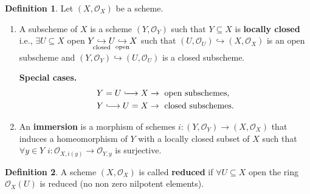 \documentclass[12pt]{article}
\theoremstyle{definition}
\newtheorem*{definition}{Definition}
\begin{document}
\begin{definition}
Let $(X,\mathcal O_X)$ be a scheme.

\begin{enumerate}[label=\arabic*)]
\item A subscheme of $X$ is a scheme $(Y,\mathcal O_Y)$ such that $Y\subseteq X$ is \textbf{locally closed} i.e., $\exists U\subseteq X$ open $Y\underset{\mathclap{\text{closed}}}\hookrightarrow U\underset{\mathclap{\text{open}}}\hookrightarrow X$ such that $(U,\mathcal O_U)\hookrightarrow(X,\mathcal O_X)$ is an open subscheme and $(Y,\mathcal O_Y)\hookrightarrow(U,\mathcal O_U)$ is a closed subscheme.

\textbf{Special cases.}
\begin{align*}
Y=U\lhook\joinrel\longrightarrow X&\rightarrow\text{ open subschemes},\\Y\lhook\joinrel\longrightarrow U=X&\rightarrow\text{ closed subschemes}.
\end{align*}

\item An \textbf{immersion} is a morphism of schemes $i:(Y,\mathcal O_Y)\rightarrow(X,\mathcal O_X)$ that induces a homeomorphism of $Y$ with a locally closed subset of $X$ such that $\forall y\in Y$ $i:\mathcal O_{X,i(y)}\rightarrow\mathcal O_{Y,y}$ is surjective.
\end{enumerate}
\end{definition}

\begin{definition}
A scheme $(X,\mathcal O_X)$ is called \textbf{reduced} if $\forall U\subseteq X$ open the ring $\mathcal O_X(U)$ is reduced (no non zero nilpotent elements).
\end{definition}
\end{document}
